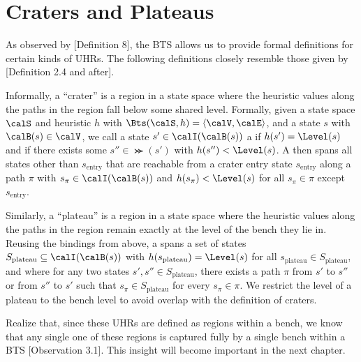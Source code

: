 \section{Craters and Plateaus}
\label{sec:cp}

As observed by [Definition 8], the BTS allows us to provide formal definitions for certain kinds of UHRs. The following definitions closely resemble those given by [Definition 2.4 and after].

Informally, a ``crater'' is a region in a state space where the heuristic values along the paths in the region fall below some shared level. Formally, given a state space $\calS$ and heuristic $h$ with $\Bts(\calS,h)=\langle\calV,\calE\rangle$, and a state $s$ with $\calB(s)\in\calV$, we call a state $s'\in\calI(\calB(s))$ a  if $h(s')=\Level(s)$ and if there exists some $s''\in\Succ(s')$ with $h(s'')<\Level(s)$. A  then spans all states other than $s_\text{entry}$ that are reachable from a crater entry state $s_\text{entry}$ along a path $\pi$ with $s_\pi\in\calI(\calB(s))$ and $h(s_\pi)<\Level(s)$ for all $s_\pi\in\pi$ except $s_\text{entry}$.

Similarly, a ``plateau'' is a region in a state space where the heuristic values along the paths in the region remain exactly at the level of the bench they lie in. Reusing the bindings from above, a  spans a set of states $S_\text{plateau}\subseteq\calI(\calB(s))$ with $h(s_\text{plateau})=\Level(s)$ for all $s_\text{plateau}\in S_\text{plateau}$, and where for any two states $s',s''\in S_\text{plateau}$, there exists a path $\pi$ from $s'$ to $s''$ or from $s''$ to $s'$ such that $s_\pi\in S_\text{plateau}$ for every $s_\pi\in\pi$. We restrict the level of a plateau to the bench level to avoid overlap with the definition of craters.

Realize that, since these UHRs are defined as regions within a bench, we know that any single one of these regions is captured fully by a single bench within a BTS [Observation 3.1]. This insight will become important in the next chapter.
